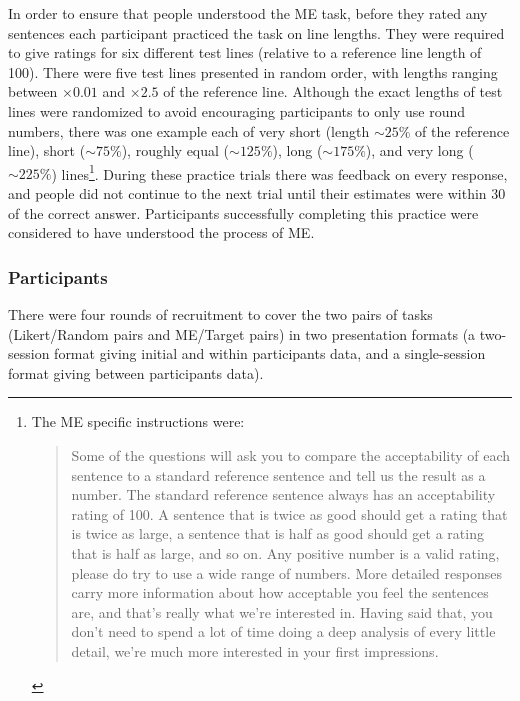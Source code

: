 \documentclass[doc]{apa6}
\newcommand{\targchoice}{{\sc Target pairs}}
\newcommand{\rndchoice}{{\sc Random pairs}}
\newcommand{\ME}{{\sc ME}}%
\newcommand{\likert}{{\sc Likert}}
\newcommand{\initial}{{\sc initial}}
\newcommand{\withinppnt}{{\sc within participants}}
\newcommand{\betweenppnt}{{\sc between participants}}
\begin{document}
In order to ensure that people understood the \ME{} task, before they rated any sentences each participant practiced the task on line lengths. They were required to give ratings for six different test lines (relative to a reference line length of 100). There were five test lines presented in random order, with lengths ranging between $\times 0.01$ and $\times 2.5$ of the reference line. Although the exact lengths of test lines were randomized to avoid encouraging participants to only use round numbers, there was one example each of very short (length $\sim{}25\%$ of the reference line), short ($\sim{}75\%$), roughly equal ($\sim{}125\%$), long ($\sim{}175\%$), and very long ($\sim{}225\%$) lines\footnote{The \ME{} specific instructions were: \begin{quote} Some of the questions will ask you to compare the acceptability of each sentence to a standard reference sentence and tell us the result as a number. The standard reference sentence always has an acceptability rating of 100. A sentence that is twice as good should get a rating that is twice as large, a sentence that is half as good should get a rating that is half as large, and so on. Any positive number is a valid rating, please do try to use a wide range of numbers. More detailed responses carry more information about how acceptable you feel the sentences are, and that's really what we're interested in. Having said that, you don't need to spend a lot of time doing a deep analysis of every little detail, we're much more interested in your first impressions.
\end{quote}
}. %
During these practice trials there was feedback on every response, and people did not continue to the next trial until their estimates were within 30 of the correct answer. Participants successfully completing this practice were considered to have understood the process of \ME.


\subsubsection{Participants}

There were four rounds of recruitment to cover the two pairs of tasks (\likert/\rndchoice{} and \ME/\targchoice) in two presentation formats (a two-session format giving \initial{} and \withinppnt{} data, and a single-session format giving \betweenppnt{} data).
\end{document}
